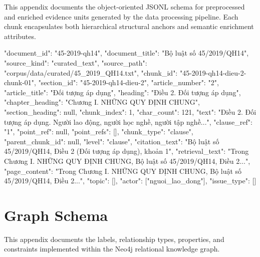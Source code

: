 This appendix documents the object-oriented JSONL schema for preprocessed and enriched evidence units generated by the data processing pipeline. Each chunk encapsulates both hierarchical structural anchors and semantic enrichment attributes.

\begin{ThesisCode}
{
  "document_id": "45-2019-qh14",
  "document_title": "Bộ luật số 45/2019/QH14",
  "source_kind": "curated_text",
  "source_path": "corpus/data/curated/45_2019_QH14.txt",
  "chunk_id": "45-2019-qh14-dieu-2-chunk-01",
  "section_id": "45-2019-qh14-dieu-2",
  "article_number": "2",
  "article_title": "Đối tượng áp dụng",
  "heading": "Điều 2. Đối tượng áp dụng",
  "chapter_heading": "Chương I. NHỮNG QUY ĐỊNH CHUNG",
  "section_heading": null,
  "chunk_index": 1,
  "char_count": 121,
  "text": "Điều 2. Đối tượng áp dụng\n{}. Người lao động, người học nghề, người tập nghề...",
  "clause_ref": "1",
  "point_ref": null,
  "point_refs": [],
  "chunk_type": "clause",
  "parent_chunk_id": null,
  "level": "clause",
  "citation_text": "Bộ luật số 45/2019/QH14, Điều 2 (Đối tượng áp dụng), khoản 1",
  "retrieval_text": "Trong Chương I. NHỮNG QUY ĐỊNH CHUNG, Bộ luật số 45/2019/QH14, Điều 2...",
  "page_content": "Trong Chương I. NHỮNG QUY ĐỊNH CHUNG, Bộ luật số 45/2019/QH14, Điều 2...",
  "topic": [],
  "actor": ["nguoi_lao_dong"],
  "issue_type": []
}
\end{ThesisCode}

\chapter{Graph Schema}
\label{app:graph-schema}

This appendix documents the labels, relationship types, properties, and constraints implemented within the Neo4j relational knowledge graph.

